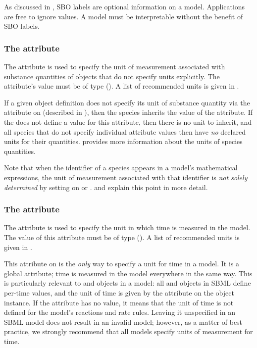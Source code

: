 As discussed in , SBO labels are optional
information on a model.  Applications are free to ignore
 values.  A model must be interpretable without the
benefit of SBO labels.


\subsubsection{The  attribute}
\label{sec:model-substanceUnits}
\label{sec:substanceunits}

The  attribute is used to specify the unit
of measurement associated with substance quantities of \Species
objects that do not specify units explicitly.  The attribute's
value must be of type 
().  A list of recommended units is
given in .

If a given \Species object definition does not specify its unit of
substance quantity via the  attribute on
\Species (described in ), then the
species inherits the value of the \Model {}
attribute.  If the \Model does not define a value for this
attribute, then there is no unit to inherit, and all species that
do not specify individual  attribute values
then have \emph{no} declared units for their quantities.
 provides more information
about the units of species quantities.

Note that when the identifier of a species appears in a model's
mathematical expressions, the unit of measurement associated with
that identifier is \emph{not solely determined} by setting
 on \Model or \Species.
 and 
explain this point in more detail.


\subsubsection{The  attribute}
\label{sec:model-timeUnits}
\label{sec:timeunits}

The  attribute is used to specify the unit in
which time is measured in the model.  The value of this attribute
must be of type 
().  A list of recommended units is
given in .

This attribute on \Model is the \emph{only} way to specify a unit
for time in a model.  It is a global attribute; time is measured
in the model everywhere in the same way.  This is particularly
relevant to \Reaction and \RateRule objects in a model: all
\Reaction and \RateRule objects in SBML define per-time values,
and the unit of time is given by the  attribute
on the \Model object instance.  If the \Model {}
attribute has no value, it means that the unit of time is not
defined for the model's reactions and rate rules.  Leaving it
unspecified in an SBML model does not result in an invalid model;
however, as a matter of best practice, we strongly recommend that
all models specify units of measurement for time.


